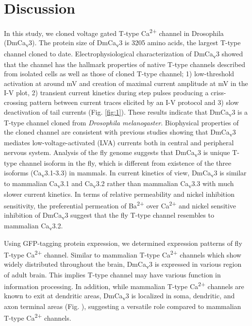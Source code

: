 \section*{Discussion}

In this study, we cloned voltage gated T-type Ca\textsuperscript{2+} channel in Drosophila (DmCa\textsubscript{v}3). The protein size of DmCa\textsubscript{v}3 is 3205 amino acids, the largest T-type channel cloned to date\cite{20056611}. Electrophysiological characterization of DmCa\textsubscript{v}3 showed that the channel has the hallmark properties of native T-type channels described from isolated cells as well as those of cloned T-type channel; 1) low-threshold activation at around  mV and creation of maximal current amplitude at  mV in the I-V plot, 2) transient current kinetics during step pulses producing a criss-crossing pattern between current traces elicited by an I-V protocol and 3) slow deactivation of tail currents (Fig. \ref{fig:1}). These results indicate that DmCa\textsubscript{v}3 is a T-type channel cloned from \emph{Drosophila melanogaster}. Biophysical properties of the cloned channel are consistent with previous studies showing that DmCa\textsubscript{v}3 mediates low-voltage-activated (LVA) currents both in central and peripheral nervous system\cite{22183725, 23864373}. Analysis of the fly genome suggests that DmCa\textsubscript{v}3 is unique T-type channel isoform in the fly, which is different from existence of the three isoforms (Ca\textsubscript{v}3.1-3.3) in mammals. In current kinetics of view, DmCa\textsubscript{v}3 is similar to mammalian Ca\textsubscript{v}3.1 and Ca\textsubscript{v}3.2 rather than mammalian Ca\textsubscript{v}3.3 with much slower current kinetics. In terms of relative permeability and nickel inhibition sensitivity, the preferential permeation of Ba\textsuperscript{2+} over Ca\textsuperscript{2+} and nickel sensitive inhibition of DmCa\textsubscript{v}3 suggest that the fly T-type channel resembles to mammalian Ca\textsubscript{v}3.2\cite{16377633, 23849427}.

Using GFP-tagging protein expression, we determined expression patterns of fly T-type Ca\textsuperscript{2+} channel.
Similar to mammalian T-type Ca\textsuperscript{2+} channels which show widely distributed throughout the brain\cite{talley:1999aa}, DmCa\textsubscript{v}3 is expressed in various region of adult brain.
This implies T-type channel may have various function in information processing.
In addition, while mammalian T-type Ca\textsuperscript{2+} channels are known to exit at dendritic areas, DmCa\textsubscript{v}3 is localized in soma, dendritic, and axon terminal areas (Fig. ), suggesting a versatile role compared to mammalian T-type Ca\textsuperscript{2+} channels. 

